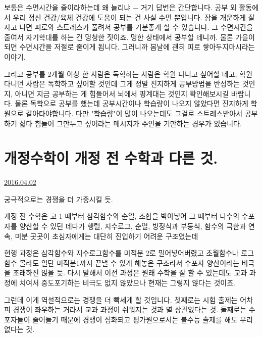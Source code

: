 보통은 수면시간을 줄이라하는데 왜 늘리냐 $-$ 거기 답변은 간단합니다.
공부 외 활동에서 우리 정신 건강/육체 건강에 도움이 되는 건 사실 수면 뿐입니다.
잠을 개운하게 잘 자고 나면 피로와 스트레스가 풀려서 공부를 기분좋게 할 수 있습니다.
그 수면시간을 줄여서 자기학대를 하는 건 멍청한 짓이죠. 멍한 상태에서 공부할 테니까.
물론 가을이 되면 수면시간을 저절로 줄이게 됩니다. 그러니까 봄날에 괜히 피로 쌓아두지마시라는 이야기.
\vspace{5mm}

그리고 공부를 2개월 이상 한 사람은 독학하는 사람은 학원 다니고 싶어할 테고, 학원 다니던 사람은 독학하고 싶어할 것인데
그게 정말 진지하게 공부방법을 반성하는 것인지, 아니면 지금 공부하는 게 힘들어서 뇌에서 핑계대는 것인지 확인해보시길 바랍니다.
물론 독학으로 공부를 했는데 공부시간이나 학습량이 나오지 않았다면 진지하게 학원으로 갈아타야합니다.
다만 "학습량"이 많이 나오는데도 그걸로 스트레스받아서 공부하기 싫다 힘들어 그만두고 싶어라는 메시지가 주인을 기만하는 경우가 있습니다.
\vspace{5mm}









\section{개정수학이 개정 전 수학과 다른 것.}
\href{https://www.kockoc.com/Apoc/708462}{2016.04.02}

\vspace{5mm}

궁극적으로는 경쟁을 더 가중시킬 듯.
\vspace{5mm}

개정 전 수학은 고 1 때부터 삼각함수와 순열, 조합을 박아넣어 그 때부터 다수의 수포자를 양산할 수 있던 데다가
행렬, 지수로그, 순열, 방정식과 부등식, 함수의 극한과 연속, 미분 곳곳이 초심자에게는 대단히 진입하기 어려운 구조였는데
\vspace{5mm}

현행 과정은 삼각함수와 지수로그함수를 미적분 2로 밀어넣어버렸고
초월함수나 로그함수 몰라도 일단 미적분1까지 끝낼 수 있게 해놓은 구조라서 수포자 양산이라는 비극을 초래하진 않을 듯.
다시 말해서 이전 과정은 원래 수학을 잘 할 수 있는데도 교과 과정에 치여서 중도포기하는 비극도 없지 않았으나
현재는 그렇지 않다는 것이죠.
\vspace{5mm}

그런데 이게 역설적으로는 경쟁을 더 빡세게 할 것입니다.
첫째로는 시험 출제는 어차피 경쟁이 좌우하는 거라서 교과 과정이 쉬워지는 것과 별 상관없다는 것.
둘째로는 수포자들이 줄어들기 때문에 경쟁이 심화되고 평가원으로서는 불수능 출제를 해도 무리없다는 것.
\vspace{5mm}


